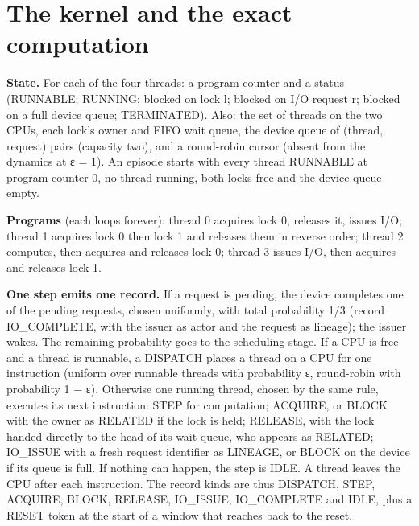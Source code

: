 \documentclass[10pt]{article}
\begin{document}
\hypertarget{the-kernel-and-the-exact-computation}{%
\section{The kernel and the exact computation}\label{the-kernel-and-the-exact-computation}}

\textbf{State.} For each of the four threads: a program counter and a status (RUNNABLE; RUNNING; blocked on lock l; blocked
on I/O request r; blocked on a full device queue; TERMINATED). Also: the set of threads on the two CPUs, each lock's
owner and FIFO wait queue, the device queue of (thread, request) pairs (capacity two), and a round-robin cursor (absent
from the dynamics at ε = 1). An episode starts with every thread RUNNABLE at program counter 0, no thread running, both
locks free and the device queue empty.

\textbf{Programs} (each loops forever): thread 0 acquires lock 0, releases it, issues I/O; thread 1 acquires lock 0 then
lock 1 and releases them in reverse order; thread 2 computes, then acquires and releases lock 0; thread 3 issues I/O,
then acquires and releases lock 1.

\textbf{One step emits one record.} If a request is pending, the device completes one of the pending requests, chosen
uniformly, with total probability 1/3 (record IO\_COMPLETE, with the issuer as actor and the request as lineage); the
issuer wakes. The remaining probability goes to the scheduling stage. If a CPU is free and a thread is runnable, a
DISPATCH places a thread on a CPU for one instruction (uniform over runnable threads with probability ε, round-robin
with probability 1 − ε). Otherwise one running thread, chosen by the same rule, executes its next instruction: STEP for computation; ACQUIRE, or
BLOCK with the owner as RELATED if the lock is held; RELEASE, with the lock handed directly to the head of its wait
queue, who appears as RELATED; IO\_ISSUE with a fresh request identifier as LINEAGE, or BLOCK on the device if its queue is full.
If nothing can happen, the step is IDLE. A thread leaves the CPU after each instruction. The record kinds are thus
DISPATCH, STEP, ACQUIRE, BLOCK, RELEASE, IO\_ISSUE, IO\_COMPLETE and IDLE, plus a RESET token at the start of a window that
reaches back to the reset.
\end{document}
